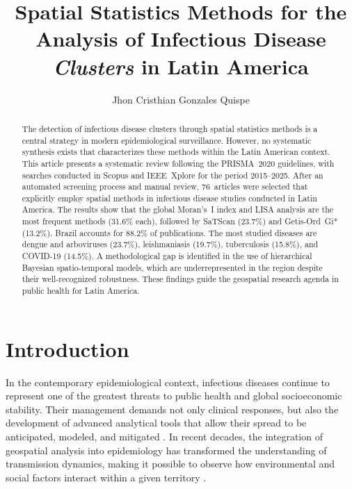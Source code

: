 \documentclass[runningheads]{llncs}
\title{Spatial Statistics Methods for the Analysis of
  Infectious Disease \textit{Clusters} in Latin America}
\author{Jhon Cristhian Gonzales Quispe}
\institute{
Universidad Nacional del Altiplano,
Puno, Peru\\
\email{j.gonzales@est.unap.edu.pe}
}
\begin{document}
\maketitle
\begin{abstract}
The detection of infectious disease clusters through spatial
statistics methods is a central strategy in modern
epidemiological surveillance. However, no systematic synthesis
exists that characterizes these methods within the Latin American
context. This article presents a systematic review following the
PRISMA~2020 guidelines, with searches conducted in Scopus and
IEEE~Xplore for the period 2015--2025. After an automated
screening process and manual review, 76~articles were selected
that explicitly employ spatial methods in infectious disease
studies conducted in Latin America. The results show that the
global Moran's~I index and LISA analysis are the most frequent
methods (31.6\% each), followed by SaTScan (23.7\%) and
Getis-Ord~Gi* (13.2\%). Brazil accounts for 88.2\% of
publications. The most studied diseases are dengue and
arboviruses (23.7\%), leishmaniasis (19.7\%), tuberculosis
(15.8\%), and COVID-19 (14.5\%). A methodological gap is
identified in the use of hierarchical Bayesian
spatio-temporal models, which are underrepresented in the
region despite their well-recognized robustness. These findings
guide the geospatial research agenda in public health for
Latin America.

\end{abstract}

\section{Introduction}

In the contemporary epidemiological context, infectious
diseases continue to represent one of the greatest threats to
public health and global socioeconomic stability. Their
management demands not only clinical responses, but also the
development of advanced analytical tools that allow their
spread to be anticipated, modeled, and mitigated
\cite{Delmelle2023}. In recent decades, the integration of
geospatial analysis into epidemiology has transformed the
understanding of transmission dynamics, making it possible to
observe how environmental and social factors interact within
a given territory \cite{Lin2022}.
\end{document}
